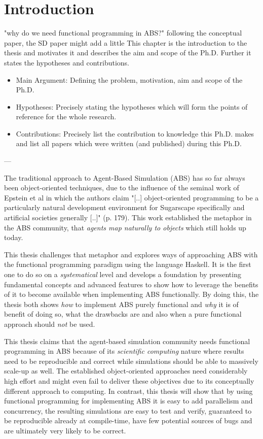 \chapter{Introduction}

"why do we need functional programming in ABS?" following the conceptual paper, the SD paper might add a little
This chapter is the introduction to the thesis and motivates it and describes the aim and scope of the Ph.D. Further it states the hypotheses and contributions.
\begin{itemize}
	\item Main Argument: Defining the problem, motivation, aim and scope of the Ph.D.
	\item Hypotheses: Precisely stating the hypotheses which will form the points of reference for the whole research.
	\item Contributions: Precisely list the contribution to knowledge this Ph.D. makes and list all papers which were written (and published) during this Ph.D.
\end{itemize}

---

The traditional approach to Agent-Based Simulation (ABS) has so far always been object-oriented techniques, due to the influence of the seminal work of Epstein et al \cite{epstein_growing_1996} in which the authors claim "[..] object-oriented programming to be a particularly natural development environment for Sugarscape specifically and artificial societies generally [..]" (p. 179). This work established the metaphor in the ABS community, that \textit{agents map naturally to objects} \cite{north_managing_2007} which still holds up today.

This thesis challenges that metaphor and explores ways of approaching ABS with the functional programming paradigm using the language Haskell. It is the first one to do so on a \textit{systematical} level and develops a foundation by presenting fundamental concepts and advanced features to show how to leverage the benefits of it \cite{hudak_haskell_1994, hudak_history_2007} to become available when implementing ABS functionally. By doing this, the thesis both shows \textit{how} to implement ABS purely functional and \textit{why} it is of benefit of doing so, what the drawbacks are and also when a pure functional approach should \textit{not} be used. 

This thesis claims that the agent-based simulation community needs functional programming in ABS because of its \textit{scientific computing} nature where results need to be reproducible and correct while simulations should be able to massively scale-up as well. The established object-oriented approaches need considerably high effort and might even fail to deliver these objectives due to its conceptually different approach to computing. In contrast, this thesis will show that by using functional programming for implementing ABS it is easy to add parallelism and concurrency, the resulting simulations are easy to test and verify, guaranteed to be reproducible already at compile-time, have few potential sources of bugs and are ultimately very likely to be correct.

